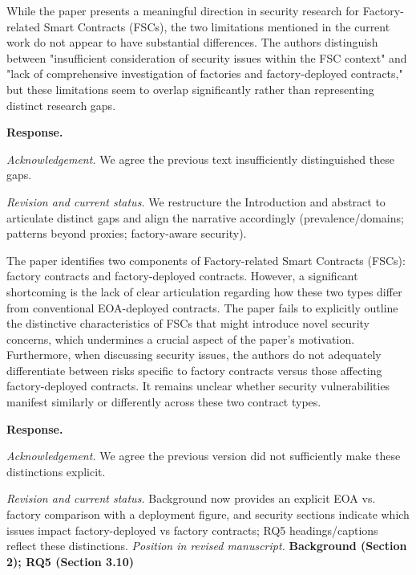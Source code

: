 \documentclass[acmsmall]{acmart}
\begin{document}
	\begin{tcolorbox}
		[commentbox,title=Reviewer \#3 -- Comment 1] While the paper presents a meaningful direction
		in security research for Factory-related Smart Contracts (FSCs), the two limitations
		mentioned in the current work do not appear to have substantial differences. The authors distinguish
		between "insufficient consideration of security issues within the FSC context" and "lack of
		comprehensive investigation of factories and factory-deployed contracts," but these
		limitations seem to overlap significantly rather than representing distinct research gaps.
	\end{tcolorbox}

	\noindent
	\textbf{Response.}

	\textit{Acknowledgement.} We agree the previous text insufficiently distinguished these gaps.

	\textit{Revision and current status.} We restructure the Introduction and abstract to articulate
	distinct gaps and align the narrative accordingly (prevalence/domains; patterns beyond proxies;
	factory-aware security).

	\begin{tcolorbox}
		[commentbox,title=Reviewer \#3 -- Comment 2] The paper identifies two components of Factory-related
		Smart Contracts (FSCs): factory contracts and factory-deployed contracts. However, a
		significant shortcoming is the lack of clear articulation regarding how these two types
		differ from conventional EOA-deployed contracts. The paper fails to explicitly outline the distinctive
		characteristics of FSCs that might introduce novel security concerns, which undermines a
		crucial aspect of the paper's motivation. Furthermore, when discussing security issues, the authors
		do not adequately differentiate between risks specific to factory contracts versus those affecting
		factory-deployed contracts. It remains unclear whether security vulnerabilities manifest
		similarly or differently across these two contract types.
	\end{tcolorbox}

	\noindent
	\textbf{Response.}

	\textit{Acknowledgement.} We agree the previous version did not sufficiently make these distinctions
	explicit.

	\textit{Revision and current status.} Background now provides an explicit EOA vs. factory comparison
	with a deployment figure, and security sections indicate which issues impact factory-deployed vs
	factory contracts; RQ5 headings/captions reflect these distinctions. \textit{Position in revised
	manuscript.} {\color{red}\textbf{Background (Section 2); RQ5 (Section 3.10)}}
\end{document}
